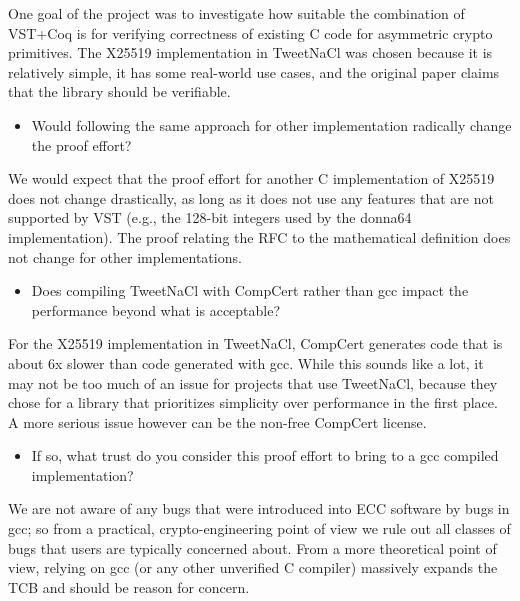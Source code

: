 \begin{answer}
    One goal of the project was to investigate how suitable the combination of
    VST+Coq is for verifying correctness of existing C code for asymmetric
    crypto primitives. The X25519 implementation in TweetNaCl was chosen because
    it is relatively simple, it has some real-world use cases, and the original
    paper claims that the library should be verifiable.
\end{answer}

\begin{itemize}
    \item Would following the same approach for other implementation radically change the proof effort?
\end{itemize}

\begin{answer}
    We would expect that the proof effort for another C implementation of X25519
    does not change drastically, as long as it does not use any features that are
    not supported by VST (e.g., the 128-bit integers used by the donna64
    implementation). The proof relating the RFC to the mathematical definition
    does not change for other implementations.
\end{answer}

\begin{itemize}
    \item Does compiling TweetNaCl with CompCert rather than gcc impact the performance beyond what is acceptable?
\end{itemize}

\begin{answer}
    For the X25519 implementation in TweetNaCl, CompCert generates code that is
    about 6x slower than code generated with gcc. While this sounds like a lot, it
    may not be too much of an issue for projects that use TweetNaCl, because they
    chose for a library that prioritizes simplicity over performance in the first
    place. A more serious issue however can be the non-free CompCert license.
\end{answer}

\begin{itemize}
    \item If so, what trust do you consider this proof effort to bring to a gcc compiled implementation?
\end{itemize}

\begin{answer}
    We are not aware of any bugs that were introduced into ECC software by bugs in
    gcc; so from a practical, crypto-engineering point of view we rule out all
    classes of bugs that users are typically concerned about. From a more
    theoretical point of view, relying on gcc (or any other unverified C compiler)
    massively expands the TCB and should be reason for concern.
\end{answer}
